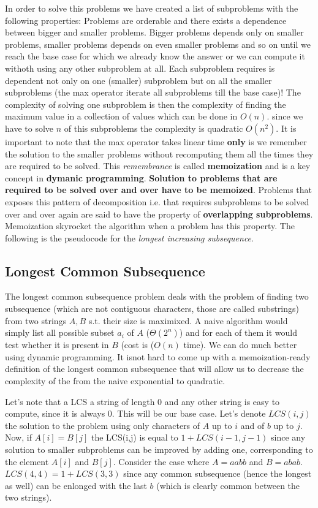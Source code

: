 In order to solve this problems we have created a list of subproblems with the following properties:
Problems are orderable and there exists a dependence between bigger and smaller problems. Bigger problems depends only on smaller problems, smaller problems depends on even smaller problems and so on until we reach the base case for which we already know the answer or we can compute it withoth using any other subproblem at all.
Each subproblem requires is dependent not only on one (smaller) subproblem but on all the smaller subproblems (the max operator iterate all subproblems till the base case)!
The complexity of solving one subproblem is then the complexity of finding the maximum value in a collection of values which can be done in $O(n)$. since we have to solve $n$ of this subproblems the complexity is quadratic $O(n^2)$. It is important to note that the max operator takes linear time \textbf{only} is we remember the solution to the smaller problems without recomputing them all the times they are required to be solved. This \textit{remembrance} is called \textbf{memoization} and is a key concept in \textbf{dymanic programming}. \textbf{Solution to problems that are required to be solved over and over have to be memoized}. 
Problems that exposes this pattern of decomposition i.e. that requires subproblems to be solved over and over again are said to have the property of \textbf{overlapping subproblems}. Memoization skyrocket the algorithm when a problem has this property.
The following is the pseudocode for the \textit{longest increasing subsequence}.

\subsection{Longest Common Subsequence}
The longest common subsequence problem deals with the problem of finding two subsequence (which are not contiguous characters, those are called substrings) from two strings $A,B$ s.t. their size is maximixed. 
A naive algorithm would simply list all possible subset $a_i$ of $A$ ($\Theta(2^n)$) and for each of them it would test whether it is present in $B$ (cost is ($O(n)$ time).
We can do much better using dynamic programming. It isnot hard to come up with a memoization-ready definition of the longest common subsequence that will allow us to decrease the complexity of the from the naive exponential to quadratic.


Let's note that a LCS a string of length $0$ and any other string is easy to compute, since it is always $0$. This will be our base case.
Let's denote $LCS(i,j)$ the solution to the problem using only characters of $A$ up to $i$ and of $b$ up to $j$. 
Now, if $A[i] = B[j] $ the LCS(i,j) is equal to $1+LCS(i-1,j-1)$ since any solution to smaller subproblems can be improved by adding one, corresponding to the element $A[i]$ and $B[j]$.
Consider the case where $A=aabb$ and $B=abab$. $LCS(4,4) = 1+LCS(3,3)$ since any common subsequence (hence the longest as well) can be enlonged with the last $b$ (which is clearly common between the two strings).

